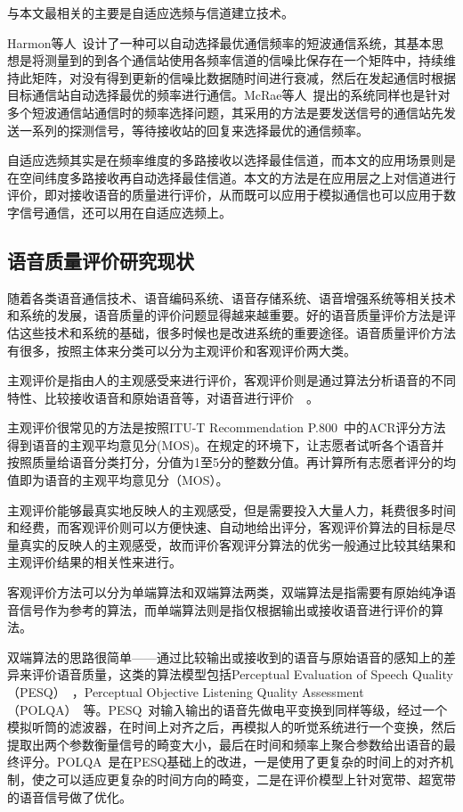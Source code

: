 与本文最相关的主要是自适应选频与信道建立技术。

Harmon等人~\cite{harmon1982adaptive}设计了一种可以自动选择最优通信频率的短波通信系统，其基本思想是将测量到的到各个通信站使用各频率信道的信噪比保存在一个矩阵中，持续维持此矩阵，对没有得到更新的信噪比数据随时间进行衰减，然后在发起通信时根据目标通信站自动选择最优的频率进行通信。McRae等人~\cite{mcrae1989frequency}提出的系统同样也是针对多个短波通信站通信时的频率选择问题，其采用的方法是要发送信号的通信站先发送一系列的探测信号，等待接收站的回复来选择最优的通信频率。

自适应选频其实是在频率维度的多路接收以选择最佳信道，而本文的应用场景则是在空间纬度多路接收再自动选择最佳信道。本文的方法是在应用层之上对信道进行评价，即对接收语音的质量进行评价，从而既可以应用于模拟通信也可以应用于数字信号通信，还可以用在自适应选频上。

\subsection{语音质量评价研究现状}

随着各类语音通信技术、语音编码系统、语音存储系统、语音增强系统等相关技术和系统的发展，语音质量的评价问题显得越来越重要。好的语音质量评价方法是评估这些技术和系统的基础，很多时候也是改进系统的重要途径。语音质量评价方法有很多，按照主体来分类可以分为主观评价和客观评价两大类。

主观评价是指由人的主观感受来进行评价，客观评价则是通过算法分析语音的不同特性、比较接收语音和原始语音等，对语音进行评价~\cite{肖累累2013语音质量客观评价方法的研究}~\cite{moller2011speech}。

主观评价很常见的方法是按照ITU-T Recommendation P.800~\cite{rec1996p}中的ACR评分方法得到语音的主观平均意见分(MOS)。在规定的环境下，让志愿者试听各个语音并按照质量给语音分类打分，分值为1至5分的整数分值。再计算所有志愿者评分的均值即为语音的主观平均意见分（MOS）。

主观评价能够最真实地反映人的主观感受，但是需要投入大量人力，耗费很多时间和经费，而客观评价则可以方便快速、自动地给出评分，客观评价算法的目标是尽量真实的反映人的主观感受，故而评价客观评分算法的优劣一般通过比较其结果和主观评价结果的相关性来进行。

客观评价方法可以分为单端算法和双端算法两类，双端算法是指需要有原始纯净语音信号作为参考的算法，而单端算法则是指仅根据输出或接收语音进行评价的算法。

双端算法的思路很简单——通过比较输出或接收到的语音与原始语音的感知上的差异来评价语音质量，这类的算法模型包括Perceptual Evaluation of Speech Quality（PESQ）~\cite{recommendation2001perceptual}，Perceptual Objective Listening Quality Assessment（POLQA）~\cite{rec2011p}等。PESQ~\cite{recommendation2001perceptual}对输入输出的语音先做电平变换到同样等级，经过一个模拟听筒的滤波器，在时间上对齐之后，再模拟人的听觉系统进行一个变换，然后提取出两个参数衡量信号的畸变大小，最后在时间和频率上聚合参数给出语音的最终评分。POLQA~\cite{rec2011p}是在PESQ基础上的改进，一是使用了更复杂的时间上的对齐机制，使之可以适应更复杂的时间方向的畸变，二是在评价模型上针对宽带、超宽带的语音信号做了优化。

